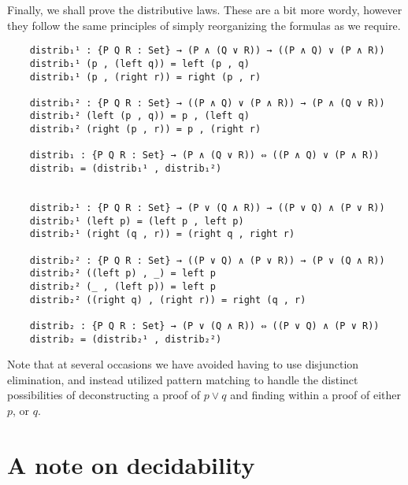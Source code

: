 \documentclass[12pt]{article}
\begin{document}
Finally, we shall prove the distributive laws. These are a bit more wordy, however they follow the same principles of simply reorganizing the formulas as we require.
\begin{verbatim}
    distrib₁¹ : {P Q R : Set} → (P ∧ (Q ∨ R)) → ((P ∧ Q) ∨ (P ∧ R))
    distrib₁¹ (p , (left q)) = left (p , q)
    distrib₁¹ (p , (right r)) = right (p , r)

    distrib₁² : {P Q R : Set} → ((P ∧ Q) ∨ (P ∧ R)) → (P ∧ (Q ∨ R))
    distrib₁² (left (p , q)) = p , (left q)
    distrib₁² (right (p , r)) = p , (right r)

    distrib₁ : {P Q R : Set} → (P ∧ (Q ∨ R)) ⇔ ((P ∧ Q) ∨ (P ∧ R))
    distrib₁ = (distrib₁¹ , distrib₁²)


    distrib₂¹ : {P Q R : Set} → (P ∨ (Q ∧ R)) → ((P ∨ Q) ∧ (P ∨ R))
    distrib₂¹ (left p) = (left p , left p)
    distrib₂¹ (right (q , r)) = (right q , right r)

    distrib₂² : {P Q R : Set} → ((P ∨ Q) ∧ (P ∨ R)) → (P ∨ (Q ∧ R))
    distrib₂² ((left p) , _) = left p
    distrib₂² (_ , (left p)) = left p
    distrib₂² ((right q) , (right r)) = right (q , r)

    distrib₂ : {P Q R : Set} → (P ∨ (Q ∧ R)) ⇔ ((P ∨ Q) ∧ (P ∨ R))
    distrib₂ = (distrib₂¹ , distrib₂²)
\end{verbatim}
Note that at several occasions we have avoided having to use disjunction elimination, and instead utilized pattern matching to handle the distinct possibilities of deconstructing a proof of $p ∨ q$ and finding within a proof of either $p$, or $q$.

\section{A note on decidability}

\printbibliography{}
\end{document}
